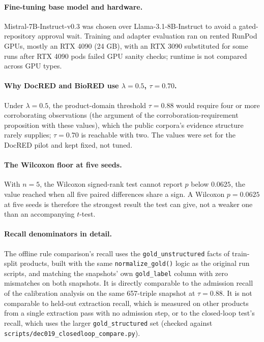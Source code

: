\documentclass[11pt]{article}
\begin{document}
\paragraph{Fine-tuning base model and hardware.}
Mistral-7B-Instruct-v0.3 was chosen over Llama-3.1-8B-Instruct to avoid
a gated-repository approval wait. Training and adapter evaluation ran on
rented RunPod GPUs, mostly an RTX 4090 (24 GB), with an RTX 3090
substituted for some runs after RTX 4090 pods failed GPU sanity checks;
runtime is not compared across GPU types.

\paragraph{Why DocRED and BioRED use $\lambda=0.5$, $\tau=0.70$.} Under
$\lambda=0.5$, the product-domain threshold $\tau=0.88$ would require
four or more corroborating observations (the argument of the
corroboration-requirement proposition with these values), which the
public corpora's evidence structure rarely supplies; $\tau=0.70$ is
reachable with two. The values were set for the DocRED pilot and kept
fixed, not tuned.

\paragraph{The Wilcoxon floor at five seeds.} With $n=5$, the Wilcoxon
signed-rank test cannot report $p$ below $0.0625$, the value reached
when all five paired differences share a sign. A Wilcoxon $p=0.0625$ at
five seeds is therefore the strongest result the test can give, not a
weaker one than an accompanying $t$-test.

\paragraph{Recall denominators in detail.} The offline rule comparison's recall uses the
\texttt{gold\_unstructured} facts of train-split products, built with the
same \texttt{normalize\_gold()} logic as the original run scripts, and
matching the snapshots' own \texttt{gold\_label} column with zero
mismatches on both snapshots. It is directly comparable to the
admission recall of the calibration analysis on the same 657-triple
snapshot at $\tau=0.88$. It is not comparable to held-out extraction
recall, which is
measured on other products from a single extraction pass with no
admission step, or to the closed-loop test's recall, which uses the
larger \texttt{gold\_structured} set (checked against
\texttt{scripts/dec019\_closedloop\_compare.py}).
\end{document}
